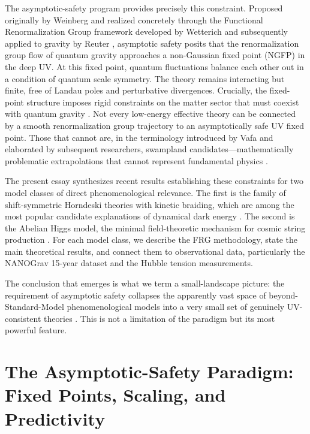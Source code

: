 \documentclass[12pt,a4paper]{article}
\begin{document}
The asymptotic-safety program provides precisely this constraint. Proposed
originally by Weinberg \cite{Weinberg1979} and realized concretely through
the Functional Renormalization Group framework developed by Wetterich
\cite{Wetterich1993} and subsequently applied to gravity by Reuter
\cite{Reuter1998}, asymptotic safety posits that the renormalization group
flow of quantum gravity approaches a non-Gaussian fixed point (NGFP) in the
deep UV. At this fixed point, quantum fluctuations balance each other out in a
condition of quantum scale symmetry. The theory remains interacting but finite,
free of Landau poles and perturbative divergences. Crucially, the fixed-point
structure imposes rigid constraints on the matter sector that must coexist with
quantum gravity \cite{Eichhorn2019,EichhornSchiffer2022handbook}. Not every
low-energy effective theory can be connected by a smooth renormalization group
trajectory to an asymptotically safe UV fixed point. Those that cannot are, in
the terminology introduced by Vafa and elaborated by subsequent researchers,
swampland candidates---mathematically problematic extrapolations that cannot
represent fundamental physics \cite{EichhornHebeckerPawlowskiWalcher2024}.

The present essay synthesizes recent results establishing these constraints
for two model classes of direct phenomenological relevance. The first is the
family of shift-symmetric Horndeski theories with kinetic braiding, which
are among the most popular candidate explanations of dynamical dark energy
\cite{EichhornLinoWagner2023}. The second is the Abelian Higgs model, the
minimal field-theoretic mechanism for cosmic string production
\cite{EichhornLinoMiqueleto2023}. For each model class, we describe the FRG
methodology, state the main theoretical results, and connect them to
observational data, particularly the NANOGrav 15-year dataset
\cite{NANOGrav2023} and the Hubble tension measurements.

The conclusion that emerges is what we term a small-landscape picture: the
requirement of asymptotic safety collapses the apparently vast space of
beyond-Standard-Model phenomenological models into a very small set of
genuinely UV-consistent theories \cite{BuoninfanteEtal2025}. This is not a
limitation of the paradigm but its most powerful feature.

\section{The Asymptotic-Safety Paradigm: Fixed Points, Scaling, and Predictivity}
\end{document}
